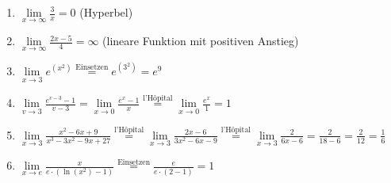 \item

\begin{enumerate}
\item $\lim\limits_{x \to \infty} \frac{3}{x} = 0$ (Hyperbel)
\item $\lim\limits_{x \to \infty} \frac{2x-5}{4} = \infty$ (lineare Funktion mit positiven Anstieg)
\item $\lim\limits_{x\to 3} e^{(x^2)} \stackrel{\text{Einsetzen}}{=} e^{(3^2)} = e^9$
\item $\lim\limits_{v\to 3} \frac{e^{v-3}-1}{v-3} = \lim\limits_{x\to 0}\frac{e^{x}-1}{x} \stackrel{\text{l'Hôpital}}{=} \lim\limits_{x\to 0} \frac{e^x}{1} = 1$
\item $\lim\limits_{x\to 3}\frac{x^2-6x+9}{x^3-3x^2-9x+27} \stackrel{\text{l'Hôpital}}{=} \lim\limits_{x\to 3}\frac{2x-6}{3x^2-6x-9} \stackrel{\text{l'Hôpital}}{=} \lim\limits_{x\to 3}\frac{2}{6x-6} = \frac{2}{18-6} = \frac{2}{12} = \frac{1}{6} $
\item $\lim\limits_{x\to e}\frac{x}{e \cdot (\ln(x^2)-1)} \stackrel{\text{Einsetzen}}{=} \frac{e}{e\cdot(2-1)} = 1$
\end{enumerate}

